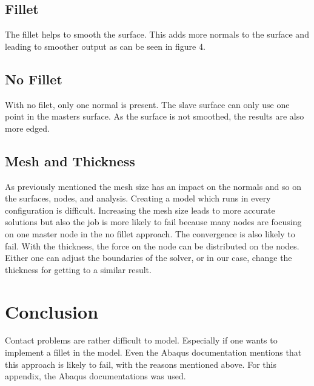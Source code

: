 \documentclass[12pt]{article}
\begin{document}
\subsection{Fillet}
The fillet helps to smooth the surface. This adds more normals to the surface and leading to smoother output as can be seen in figure 4. 
\subsection{No Fillet}
With no filet, only one normal is present. The slave surface can only use one point in the masters surface. As the surface is not smoothed, the results are also more edged.
\subsection{Mesh and Thickness}
As previously mentioned the mesh size has an impact on the normals and so on the surfaces, nodes, and analysis. Creating a model which runs in every configuration is difficult. Increasing the mesh size leads to more accurate solutions but also the job is more likely to fail because many nodes are focusing on one master node in the no fillet approach. The convergence is also likely to fail. With the thickness, the force on the node can be distributed on the nodes. Either one can adjust the boundaries of the solver, or in our case, change the thickness for getting to a similar result.
\section{Conclusion}
Contact problems are rather difficult to model. Especially if one wants to implement a fillet in the model. Even the Abaqus documentation mentions that this approach is likely to fail, with the reasons mentioned above. For this appendix, the Abaqus documentations was used.
\end{document}
